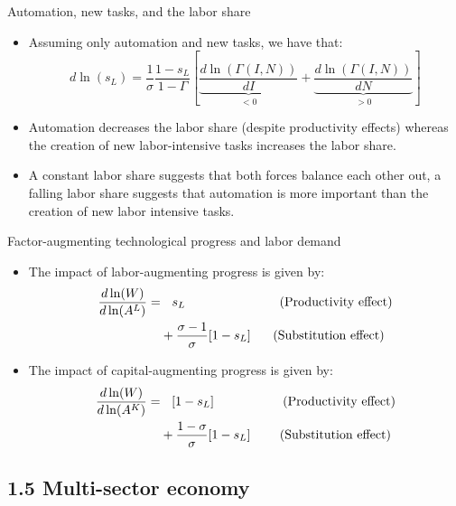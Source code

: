 \documentclass[notes=show]{beamer}
\begin{document}
\begin{frame}{Automation, new tasks, and the labor share}
\begin{itemize}
\item Assuming only automation and new tasks, we have that:
\[
d \ln (s_{L}) = \frac{1}{\sigma} \frac{1-s_{L}}{1- \Gamma} \left[ \underbrace{\frac{d \ln (\Gamma(I,N))}{dI}}_{<0} + \underbrace{\frac{d \ln (\Gamma(I,N))}{dN}}_{>0} \right]
\]
\item Automation decreases the labor share (despite productivity effects) whereas the creation of new labor-intensive tasks increases the labor share. \medskip
\item A constant labor share suggests that both forces balance each other out, a falling labor share suggests that automation is more important than the creation of new labor intensive tasks.
\end{itemize}
\end{frame}

\begin{frame}{Factor-augmenting technological progress and labor demand}
\begin{itemize}
\item The impact of labor-augmenting progress is given by:
\begin{align*}
\frac{d \ln (W) }{d \ln (A^{L})} = & \text{ \hspace{0.2cm}} s_{L} \text{ \hspace{2.5cm}(Productivity effect)} \\
& + \frac{\sigma - 1}{ \sigma} [1-s_{L}] \text{ \hspace{0.5cm}(Substitution effect)}
\end{align*}
\item The impact of capital-augmenting progress is given by:
\begin{align*}
\frac{d \ln (W) }{d \ln (A^{K})} = & \text{ \hspace{0.2cm}} [1- s_{L}] \text{ \hspace{1.8cm}(Productivity effect)} \\
& + \frac{1- \sigma}{ \sigma} [1-s_{L}] \text{ \hspace{0.7cm}(Substitution effect)}
\end{align*}
\end{itemize}
\end{frame}

\subsection{1.5 Multi-sector economy}
\end{document}
